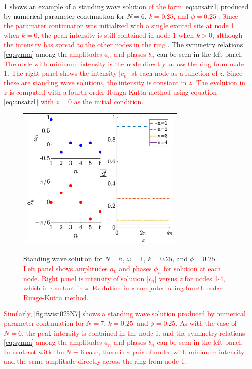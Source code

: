 \documentclass[reprint, amsmath,amssymb,aps,pra]{revtex4-2}
\renewcommand{\revised}[1]{ \textcolor{red}{#1} }
\begin{document}
\cref{fig:twist025} shows an example of a standing wave solution \revised{of the form \cref{eq:ansatz1}} produced by numerical parameter continuation for $N = 6$, \revised{$k = 0.25$, and $\phi = 0.25$}. \revised{Since the paramater continuaton was initialized with a single excited site at node 1 when $k=0$, the peak intensity is still contained in node 1 when $k>0$, although the intensity has spread to the other nodes in the ring}. The symmetry relations \cref{eq:symm} among the \revised{amplitudes $a_n$ and phases $\theta_n$} can be seen in the left panel. \revised{The node with minimum intensity is the node directly across the ring from node 1. The right panel shows the intensity $|c_n|$ at each node as a function of $z$. Since these are standing wave solutions, the intensity is constant in $z$. The evolution in $z$ is computed with a fourth-order Runga-Kutta method using equation \cref{eq:ansatz1} with $z=0$ as the initial condition. }

\begin{figure}
\begin{center}
\begin{tabular}{c}
\includegraphics[width=8cm]{twist025.eps}
\end{tabular}
\end{center}
\caption{Standing wave solution for $N = 6$, $\omega = 1$, $k = 0.25$, and $\phi = 0.25$. \revised{Left panel shows amplitudes $a_n$ and phases $\phi_n$ for solution at each node. Right panel is intensity of solution $|c_n|$ versus $z$ for nodes 1-4, which is constant in $z$. Evolution in $z$ computed using fourth order Runge-Kutta method.} }
\label{fig:twist025}
\end{figure}

\revised{Similarly, \cref{fig:twist025N7} shows a standing wave solution produced by numerical parameter continuation for $N = 7$, $k = 0.25$, and $\phi = 0.25$. As with the case of $N=6$, the peak intensity is contained in the node 1, and the symmetry relations \cref{eq:symm} among the amplitudes $a_n$ and phases $\theta_n$ can be seen in the left panel. In contrast with the $N=6$ case, there is a pair of nodes with minimum intensity and the same amplitude directly across the ring from node 1.}
\end{document}
